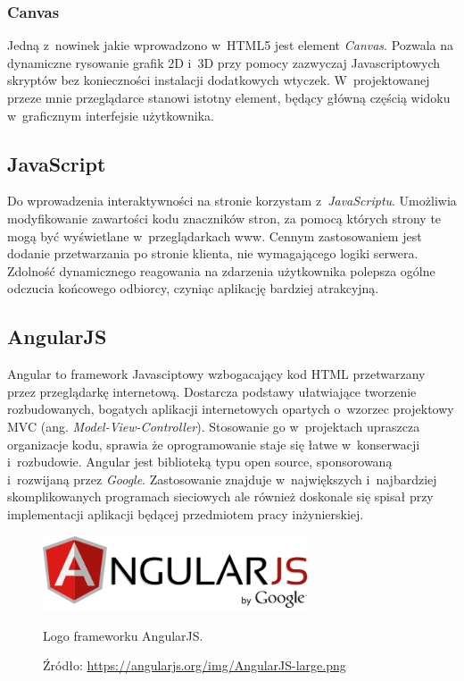 \documentclass[a4paper,12pt,oneside]{mwrep}  %
\begin{document}
\subsubsection{Canvas}
Jedną z~nowinek jakie wprowadzono w~HTML5 jest element \emph{Canvas}. Pozwala na dynamiczne rysowanie grafik 2D i~3D przy pomocy zazwyczaj Javascriptowych skryptów bez konieczności instalacji dodatkowych wtyczek. W~projektowanej przeze mnie przeglądarce stanowi istotny element, będący główną częścią widoku w~graficznym interfejsie użytkownika.
\subsection{JavaScript}
Do wprowadzenia interaktywności na stronie korzystam z~\emph{JavaScriptu}. Umożliwia modyfikowanie zawartości kodu znaczników stron, za pomocą których strony te mogą być wyświetlane w~przeglądarkach www. Cennym zastosowaniem jest dodanie przetwarzania po stronie klienta, nie wymagającego logiki serwera. Zdolność dynamicznego reagowania na zdarzenia użytkownika polepsza ogólne odczucia końcowego odbiorcy, czyniąc aplikację bardziej atrakcyjną. %
\subsection{AngularJS}
Angular to framework Javasciptowy wzbogacający kod HTML przetwarzany przez przeglądarkę internetową. Dostarcza podstawy ułatwiające tworzenie rozbudowanych, bogatych aplikacji internetowych opartych o~wzorzec projektowy MVC (ang. \emph{Model-View-Controller}).
Stosowanie go w~projektach upraszcza organizacje kodu, sprawia że oprogramowanie staje się łatwe w~konserwacji i~rozbudowie.
Angular jest biblioteką typu open source, sponsorowaną i~rozwijaną przez \emph{Google}. Zastosowanie znajduje w~największych i~najbardziej skomplikowanych programach sieciowych ale również doskonale się spisał przy implementacji aplikacji będącej przedmiotem pracy inżynierskiej. %
\begin{figure}[h]
\centering
\includegraphics[width=0.7\textwidth]{grafika/loga/angular.png}
\caption{Logo frameworku AngularJS.}
\vspace{-0.8cm}
\caption*{\scriptsize Źródło: \url{https://angularjs.org/img/AngularJS-large.png}}
\label{angular}
\end{figure}
\end{document}
